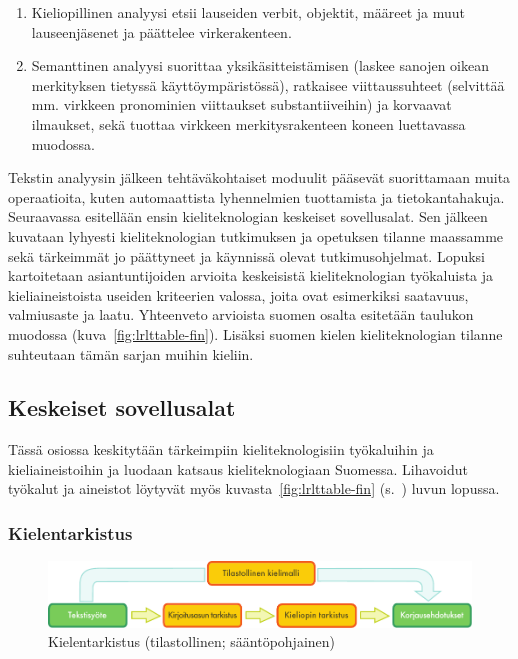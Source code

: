 \begin{multicols}{2}
\begin{enumerate}
\item Kieliopillinen analyysi etsii lauseiden verbit, objektit, määreet ja muut lauseenjäsenet ja päättelee virkerakenteen.

\item Semanttinen analyysi suorittaa yksikäsitteistämisen (laskee sanojen oikean merkityksen tietyssä käyttöympäristössä), ratkaisee viittaussuhteet (selvittää mm. virkkeen pronominien viittaukset substantiiveihin) ja korvaavat ilmaukset, sekä tuottaa virkkeen merkitysrakenteen koneen luettavassa muodossa.  
\end{enumerate}

Tekstin analyysin jälkeen tehtäväkohtaiset moduulit pääsevät suorittamaan muita operaatioita, kuten automaattista lyhennelmien tuottamista ja tietokantahakuja.  Seuraavassa esitellään ensin kieliteknologian keskeiset sovellusalat.  Sen jälkeen kuvataan lyhyesti kieliteknologian tutkimuksen ja opetuksen tilanne maassamme sekä tärkeimmät jo päättyneet ja käynnissä olevat tutkimusohjelmat. Lopuksi kartoitetaan asiantuntijoiden arvioita keskeisistä kieliteknologian työkaluista ja kieliaineistoista useiden kriteerien valossa, joita ovat esimerkiksi saatavuus, valmiusaste ja laatu. Yhteenveto arvioista suomen osalta esitetään taulukon muodossa (kuva~\ref{fig:lrlttable-fin}). Lisäksi suomen kielen kieliteknologian tilanne suhteutaan tämän sarjan muihin kieliin.

\subsection{Keskeiset sovellusalat}

Tässä osiossa keskitytään tärkeimpiin kieliteknologisiin työkaluihin ja kieliaineistoihin ja luodaan katsaus kieliteknologiaan Suomessa.  Lihavoidut työkalut ja aineistot löytyvät myös kuvasta~\ref{fig:lrlttable-fin} (s.~\pageref{fig:lrlttable-fin}) luvun lopussa.

\subsubsection{Kielentarkistus}

\begin{figure}[t]
  \center
  \includegraphics[width=\textwidth]{../_media/finnish/language_checking}
  \caption{Kielentarkistus (tilastollinen; sääntöpohjainen)}
  \label{fig:langcheckingarch-fin}
\end{figure}


\end{multicols}
